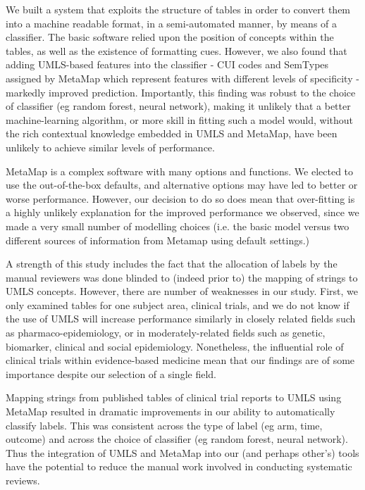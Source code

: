 \documentclass[10.7pt,]{article}
\begin{document}
We built a system that exploits the structure of tables in order to convert them into a machine readable format, in a semi-automated manner, by means of a classifier. The basic software relied upon the position of concepts within the tables, as well as the existence of formatting cues. However, we also found that adding UMLS-based features into the classifier - CUI codes and SemTypes assigned by MetaMap which represent features with different levels of specificity - markedly improved prediction. Importantly, this finding was robust to the choice of classifier (eg random forest, neural network), making it unlikely that a better machine-learning algorithm, or more skill in fitting such a model would, without the rich contextual knowledge embedded in UMLS and MetaMap, have been unlikely to achieve similar levels of performance.
%


MetaMap is a complex software with many options and functions. We elected to use the out-of-the-box defaults, and alternative options may have led to better or worse performance. However, our decision to do so does mean that over-fitting is a highly unlikely explanation for the improved performance we observed, since we made a very small number of modelling choices (i.e. the basic model versus two different sources of information from Metamap using default settings.)


A strength of this study includes the fact that the allocation of labels by the manual reviewers was done blinded to (indeed prior to) the mapping of strings to UMLS concepts. However, there are number of weaknesses in our study. First, we only examined tables for one subject area, clinical trials, and we do not know if the use of UMLS will increase performance similarly in closely related fields such as pharmaco-epidemiology, or in moderately-related fields such as genetic, biomarker, clinical and social epidemiology. Nonetheless, the influential role of clinical trials within evidence-based medicine mean that our findings are of some importance despite our selection of a single field.

Mapping strings from published tables of clinical trial reports to UMLS using MetaMap resulted in dramatic improvements in our ability to automatically classify labels. This was consistent across the type of label (eg arm, time, outcome) and across the choice of classifier (eg random forest, neural network). Thus the integration of UMLS and MetaMap into our (and perhaps other's) tools have the potential to reduce the manual work involved in conducting systematic reviews.
\end{document}
